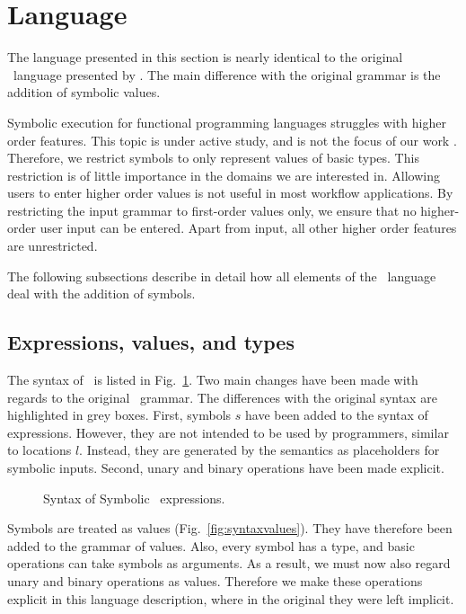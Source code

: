 

\section{Language}
\label{sec:language}

The language presented in this section is nearly identical to the original \TOPHAT\ language presented by \citet{DBLP:conf/ppdp/SteenvoordenNK19}.
The main difference with the original grammar is the addition of symbolic values.

Symbolic execution for functional programming languages struggles with higher order features.
This topic is under active study, and is not the focus of our work \cite{HallahanXP2017, DBLP:conf/pldi/HallahanXBJP19}.
Therefore, we restrict symbols to only represent values of basic types.
This restriction is of little importance in the domains we are interested in.
Allowing users to enter higher order values is not useful in most workflow applications.
By restricting the input grammar to first-order values only, we ensure that no higher-order user input can be entered.
Apart from input, all other higher order features are unrestricted.

The following subsections describe in detail how all elements of the \TOPHAT\ language deal with the addition of symbols.



\subsection{Expressions, values, and types}
\label{sec:expressions}

The syntax of \STOPHAT\ is listed in Fig.~\ref{fig:syntaxtophat}.
Two main changes have been made with regards to the original \TOPHAT\ grammar.
The differences with the original syntax are highlighted in grey boxes.
First, symbols $s$ have been added to the syntax of expressions.
However, they are not intended to be used by programmers, similar to locations $l$.
Instead, they are generated by the semantics as placeholders for symbolic inputs.
Second, unary and binary operations have been made explicit.

\begin{figure}[ht]
  \small
  \caption{Syntax of Symbolic \TOPHAT\ expressions.}
  \label{fig:syntaxtophat}
\end{figure}

Symbols are treated as values (Fig.~\ref{fig:syntaxvalues}).
They have therefore been added to the grammar of values.
Also, every symbol has a type, and basic operations can take symbols as arguments.
As a result, we must now also regard unary and binary operations as values.
Therefore we make these operations explicit in this language description,
where in the original they were left implicit.

